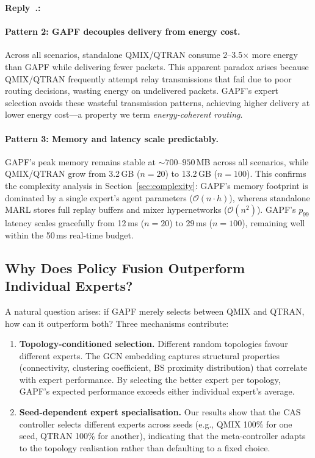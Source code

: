 \documentclass[11pt]{article}
\newcounter{reviewer}
\newcounter{replyctr}[reviewer]
\renewcommand{\thereplyctr}{\thereviewer.\arabic{replyctr}}
\newenvironment{reply}
  {\refstepcounter{replyctr}%
   \addtocounter{replyctr}{-1}%
   \medskip\noindent
   \begin{sf}\textbf{Reply~\thereplyctr:}\ }
  {\addtocounter{replyctr}{1}%
   \medskip\end{sf}}
\begin{document}
\begin{refsection}
\begin{mdframed}[style=Resp]
\begin{reply}
\paragraph{Pattern 2: GAPF decouples delivery from energy cost.}
Across all scenarios, standalone QMIX/QTRAN consume 2--3.5$\times$ more energy than GAPF while delivering fewer packets. This apparent paradox arises because QMIX/QTRAN frequently attempt relay transmissions that fail due to poor routing decisions, wasting energy on undelivered packets. GAPF's expert selection avoids these wasteful transmission patterns, achieving higher delivery at lower energy cost---a property we term \emph{energy-coherent routing}.

\paragraph{Pattern 3: Memory and latency scale predictably.}
GAPF's peak memory remains stable at ${\sim}700\text{--}950$\,MB across all scenarios, while QMIX/QTRAN grow from 3.2\,GB ($n{=}20$) to 13.2\,GB ($n{=}100$). This confirms the complexity analysis in Section~\ref{sec:complexity}: GAPF's memory footprint is dominated by a single expert's agent parameters ($\mathcal{O}(n \cdot h)$), whereas standalone MARL stores full replay buffers and mixer hypernetworks ($\mathcal{O}(n^2)$). GAPF's $p_{99}$ latency scales gracefully from 12\,ms ($n{=}20$) to 29\,ms ($n{=}100$), remaining well within the 50\,ms real-time budget.

\subsection{Why Does Policy Fusion Outperform Individual Experts?}

A natural question arises: if GAPF merely selects between QMIX and QTRAN, how can it outperform both? Three mechanisms contribute:

\begin{enumerate}
    \item \textbf{Topology-conditioned selection.} Different random topologies favour different experts. The GCN embedding captures structural properties (connectivity, clustering coefficient, BS proximity distribution) that correlate with expert performance. By selecting the better expert per topology, GAPF's expected performance exceeds either individual expert's average.
    
    \item \textbf{Seed-dependent expert specialisation.} Our results show that the CAS controller selects different experts across seeds (e.g., QMIX 100\% for one seed, QTRAN 100\% for another), indicating that the meta-controller adapts to the topology realisation rather than defaulting to a fixed choice.
    

\end{enumerate}
\end{reply}
\end{mdframed}
\end{refsection}
\end{document}
